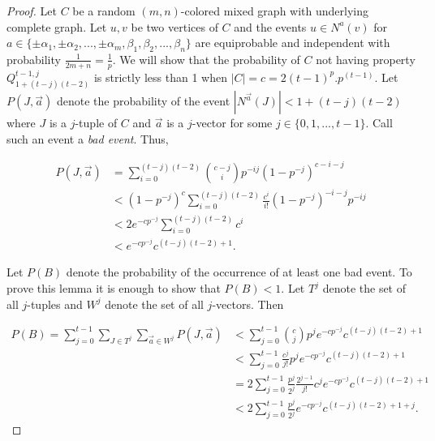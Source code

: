 \documentclass[11pt]{article}
\begin{document}
\begin{proof}
Let $C$ be a random $(m,n)$-colored  mixed graph with underlying complete graph. Let $u,v$ be two vertices of $C$ and the events $u \in N^{a}(v)$
for $a \in \{\pm \alpha_1, \pm \alpha_2, ...,  \pm \alpha_m,  \beta_1, \beta_2, ..., \beta_n\}$ are equiprobable and independent  with probability $\frac{1}{2m+n} = \frac{1}{p}$. 
We will show that the probability of $C$ not having property $Q^{t-1,j}_{1+(t-j)(t-2)}$ is strictly less than 1 when 
$|C| = c = 2 (t-1)^p .p^{(t-1)}$. Let $P(J,\vec{a})$ denote the probability of the event $|N^{\vec{a}}(J)| < 1+(t-j)(t-2)$ where $J$ is a $j$-tuple of $C$ and $\vec{a}$ is a $j$-vector for some $j \in \{0,1,...,t-1\}$. Call such an event a \textit{bad event}. Thus,


\begin{equation} \label{eq1}
\begin{split}
P(J, \vec{a}) & = \sum\limits_{i=0}^{(t - j)(t - 2)} {c-j \choose i} p^{-ij} (1 - p^{-j})^{c - i - j} \\
 & < (1 - p^{-j})^c \sum\limits_{i=0}^{(t - j)(t - 2)} \frac{c^i}{i!} (1 - p^{-j})^{- i - j} p^{-ij} \\
 & < 2 e^{-cp^{-j}} \sum\limits_{i=0}^{(t - j)(t - 2)} c^i \\
 & < e^{-cp^{-j}} c^{(t - j)(t - 2) + 1}.
\end{split}
\end{equation}

Let $P(B)$ denote the probability of the occurrence of at least one bad event. 
To prove this lemma it is enough to  show that $P(B) < 1$. Let $T^j$ denote the set of all $j$-tuples and $W^j$ denote the set of all $j$-vectors.  Then 

\begin{equation} \label{eq2}
\begin{split}
P(B) = \sum_{j=0}^{t - 1} \sum_{J \in T^j} \sum_{\vec{a} \in W^j} P(J, \vec{a}) & < \sum\limits_{j=0}^{t - 1} {c \choose j} p^j e^{-cp^{-j}} c^{(t - j)(t - 2) + 1} \\
 & < \sum\limits_{j=0}^{t - 1} \frac{c^j}{j!} p^j e^{-cp^{-j}} c^{(t - j)(t - 2) + 1} \\
 & = 2 \sum\limits_{j=0}^{t - 1} \frac{p^j}{2^j} \frac{2^{j-1}}{j!}  c^j e^{-cp^{-j}} c^{(t - j)(t - 2) + 1} \\
 & < 2 \sum\limits_{j=0}^{t - 1} \frac{p^j}{2^j} e^{-cp^{-j}} c^{(t - j)(t - 2) + 1 + j}.
\end{split}
\end{equation}


\end{proof}
\end{document}
